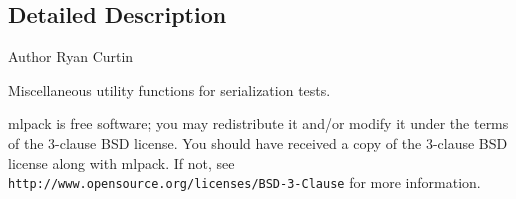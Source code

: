 \subsection{Detailed Description}
\begin{DoxyAuthor}{Author}
Ryan Curtin
\end{DoxyAuthor}
Miscellaneous utility functions for serialization tests.

mlpack is free software; you may redistribute it and/or modify it under the terms of the 3-\/clause B\+SD license. You should have received a copy of the 3-\/clause B\+SD license along with mlpack. If not, see {\tt http\+://www.\+opensource.\+org/licenses/\+B\+S\+D-\/3-\/\+Clause} for more information. 